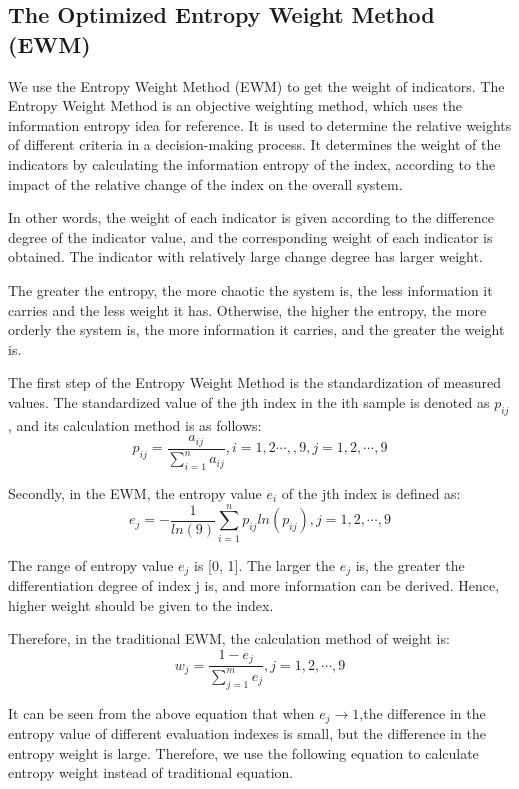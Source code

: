 \MinParskip{}

\subsection{The Optimized Entropy Weight Method (EWM) }
We use the Entropy Weight Method (EWM) to get the weight of indicators. The Entropy Weight Method is an objective weighting method, which uses the information entropy idea for reference. It is used to determine the relative weights of different criteria in a decision-making process. It determines the weight of the indicators by calculating the information entropy of the index, according to the impact of the relative change of the index on the overall system.

In other words, the weight of each indicator is given according to the difference degree of the indicator value, and the corresponding weight of each indicator is obtained. The indicator with relatively large change degree has larger weight. 

The greater the entropy, the more chaotic the system is, the less information it carries and the less weight it has. Otherwise, the higher the entropy, the more orderly the system is, the more information it carries, and the greater the weight is.

The first step of the Entropy Weight Method is the standardization of measured values. The standardized value of the jth index in the ith sample is denoted as $p_{ij}$, and its calculation method is as follows:$$p_{ij}=\frac{a_{ij}}{\sum_{i=1}^na_{ij}},i=1,2\cdots,,9,j=1,2,\cdots,9$$

Secondly, in the EWM, the entropy value $e_i$ of the jth index is defined as:$$e_j=-\frac{1}{ln(9)}\sum_{i=1}^np_{ij}ln(p_{ij}),j=1,2,\cdots,9$$

The range of entropy value $e_j$ is [0, 1]. The larger the $e_j$ is, the greater the differentiation degree of index j is, and more information can be derived. Hence, higher weight should be given to the index. 

Therefore, in the traditional EWM, the calculation method of weight is:$$w_j=\frac{1-e_j}{\sum_{j=1}^me_j},j=1,2,\cdots,9$$

It can be seen from the above equation that when $e_j\rightarrow1$,the difference in the entropy value of different evaluation indexes is small, but the difference in the entropy weight is large. Therefore, we use the following equation to calculate entropy weight instead of traditional equation.

